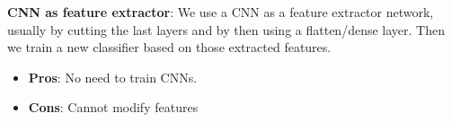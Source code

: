 \textbf{CNN as feature extractor}: We use a CNN as a feature extractor network, usually by cutting the last layers and by then using a flatten/dense layer. Then we train a new classifier based on those extracted features.
\begin{itemize}
        \item \textbf{Pros}: No need to train CNNs.
        \item \textbf{Cons}: Cannot modify features
\end{itemize}

